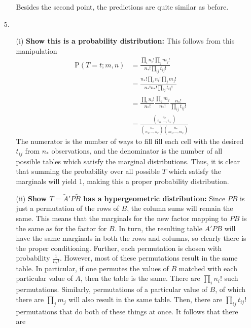 \documentclass[11pt]{article}
\newcommand{\p}{\mathrm{P}}
\theoremstyle{definition}
\begin{document}
\begin{itemize}
\begin{itemize}
                \FloatBarrier
                
                \FloatBarrier
                Besides the second point, the predictions are quite similar as before.
        \end{itemize}
    \item[5.]
        \begin{itemize}
            \item[(i)] {\bf Show this is a probability distribution:}
                This follows from this manipulation
                \begin{align*}
                    \p(T=t;m,n) &= \frac{\prod_i n_i! \prod_j m_j!}{n_*! \prod_{ij} t_{ij}!} \\
                                &= \frac{n_*!\prod_i n_i! \prod_j m_j!}{n_*!n_*! \prod_{ij} t_{ij}!} \\
                                &= \frac{\prod_i n_i!}{n_*!}\frac{\prod_j m_j}{n_*!}\frac{n_*!}{ \prod_{ij} t_{ij}!} \\
                                &= \frac{{{n_*}\choose {t_{11},...,t_{cr}}}}{{{n_*}\choose {n_1,...,n_r}}{{n_*}\choose {m_1,...,m_c}}}
                \end{align*}
                The numerator is the number of ways to fill fill each cell with the desired $t_{ij}$ from $n_*$ observations, and the denominator is the number of all possible tables which satisfy the marginal distributions. Thus, it is clear that summing the probability over all possible $T$ which satisfy the marginals will yield 1, making this a proper probability distribution.
            \item[(ii)] {\bf Show $T=\tilde A'P\tilde B$ has a hypergeometric distribution:} Since $PB$ is just a permutation of the rows of $B$, the column sums will remain the same. This means that the marginals for the new factor mapping to $PB$ is the same as for the factor for $B$. In turn, the resulting table $A'PB$ will have the same marginals in both the rows and columns, so clearly there is the proper conditioning. Further, each permutation is chosen with probability $\frac{1}{n_*!}$. However, most of these permutations result in the same table. In particular, if one permutes the values of $B$ matched with each particular value of $A$, then the table is the same. There are $\prod_i n_i!$ such permutations. Similarly, permutations of a particular value of $B$, of which there are $\prod_j m_j$ will also result in the same table. Then, there are $\prod_{ij}t_{ij}!$ permutations that do both of these things at once. It follows that there are 

\end{itemize}
\end{itemize}
\end{document}
